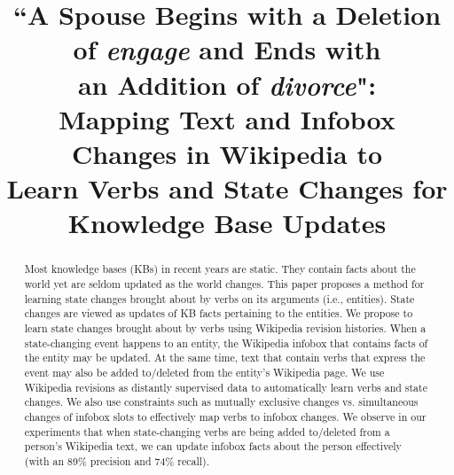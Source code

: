 \documentclass[11pt,a4paper]{article}
\title{``A Spouse Begins with a Deletion of \textit{engage} and Ends with \\an Addition of \textit{divorce}": \\Mapping Text and Infobox Changes in Wikipedia to \\Learn Verbs and State Changes for Knowledge Base Updates}
\author{%
  }
\date{}
\begin{document}
\maketitle


\begin{abstract}
Most knowledge bases (KBs) %
in recent years are static. They contain facts about the world yet are seldom updated as the world changes. This paper proposes a method for learning state changes brought about by verbs on its arguments (i.e., entities). State changes are viewed as updates of KB facts pertaining to the entities. We propose to learn state changes brought about by verbs using Wikipedia revision histories. When a state-changing event happens to an entity, the Wikipedia infobox that contains facts of the entity may be updated. At the same time, text that contain verbs that express the event may also be added to/deleted from the entity's Wikipedia page. We use Wikipedia revisions %
as distantly supervised data to automatically learn verbs and state changes. We also use %
constraints such as mutually exclusive changes vs. simultaneous changes of infobox slots to effectively map verbs to infobox changes. We observe in our experiments that when state-changing verbs are being added to/deleted from a person's Wikipedia text, we can update infobox facts about the person effectively (with an 89\% precision and 74\% recall). 

\end{abstract}








\end{document}

